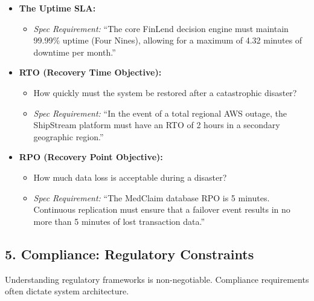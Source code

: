 \begin{itemize}
\tightlist
\item
  \textbf{The Uptime SLA:}

  \begin{itemize}
  \tightlist
  \item
    \emph{Spec Requirement:} ``The core FinLend decision engine must
    maintain 99.99\% uptime (Four Nines), allowing for a maximum of 4.32
    minutes of downtime per month.''
  \end{itemize}
\item
  \textbf{RTO (Recovery Time Objective):}

  \begin{itemize}
  \tightlist
  \item
    How quickly must the system be restored after a catastrophic
    disaster?
  \item
    \emph{Spec Requirement:} ``In the event of a total regional AWS
    outage, the ShipStream platform must have an RTO of 2 hours in a
    secondary geographic region.''
  \end{itemize}
\item
  \textbf{RPO (Recovery Point Objective):}

  \begin{itemize}
  \tightlist
  \item
    How much data loss is acceptable during a disaster?
  \item
    \emph{Spec Requirement:} ``The MedClaim database RPO is 5 minutes.
    Continuous replication must ensure that a failover event results in
    no more than 5 minutes of lost transaction data.''
  \end{itemize}
\end{itemize}

\subsection{5. Compliance: Regulatory
Constraints}\label{compliance-regulatory-constraints}

Understanding regulatory frameworks is non-negotiable. Compliance
requirements often dictate system architecture.

